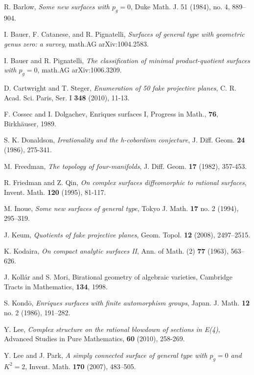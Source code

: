 \documentclass[twoside,11pt]{amsart}
\begin{document}
\begin{thebibliography}{99}

 R. Barlow, {\it Some new surfaces with $p_g=0$}, Duke Math. J. 51 (1984), no. 4, 889--904.

 I. Bauer, F. Catanese, and R. Pignatelli, {\it Surfaces of general type with geometric genus zero: a
survey}, math.AG arXiv:1004.2583.

 I. Bauer and R. Pignatelli, {\it The classification of minimal product-quotient surfaces with
$p_g=0$}, math.AG arXiv:1006.3209.

 D. Cartwright and T. Steger, {\it Enumeration of 50 fake projective planes},
C. R. Acad. Sci. Paris, Ser. I {\bf 348} (2010), 11-13.

 F. Cossec and I. Dolgachev, Enriques surfaces
I, Progress in Math., {\bf 76}, Birkh\"auser, 1989.

 S. K. Donaldson, {\it Irrationality and the h-cobordism conjecture}, J. Diff. Geom. {\bf 24} (1986), 275-341.

 M. Freedman, {\it The topology of four-manifolds}, J. Diff. Geom. {\bf
17} (1982), 357-453.

 R. Friedman and Z. Qin, {\it On complex surfaces diffeomorphic to
rational surfaces}, Invent. Math. {\bf 120} (1995), 81-117.

 M. Inoue, {\it Some new surfaces of general type}, Tokyo J. Math.
{\bf 17} no. 2 (1994), 295--319.

 J. Keum, {\it Quotients of fake projective planes}, Geom. Topol. {\bf 12} (2008), 2497--2515.

 K. Kodaira, {\it On compact analytic surfaces II}, Ann. of Math. (2)
{\bf 77} (1963), 563--626.

  J. Koll\'ar and S. Mori, Birational geometry of algebraic
                  varieties,  Cambridge Tracts in Mathematics, {\bf 134}, 1998.

 S. Kond\=o, {\it Enriques surfaces with finite automorphism groups}, Japan. J. Math.
{\bf 12} no. 2 (1986), 191--282.

 Y. Lee, {\it Complex structure on the rational blowdown of sections in
E(4)}, Advanced Studies in Pure Mathematics, {\bf 60} (2010),
258-269.

 Y. Lee and J. Park, {\it A simply connected surface of general
                 type with $p_g=0$ and $K^2=2$}, Invent. Math.
                  {\bf 170} (2007), 483--505.


\end{thebibliography}
\end{document}
